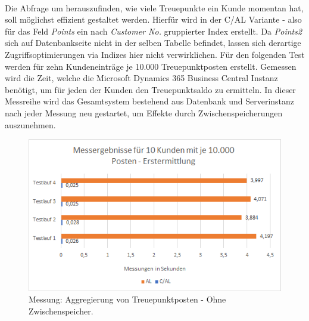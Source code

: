 \paragraph{}
Die Abfrage um herauszufinden, wie viele Treuepunkte ein Kunde momentan hat, soll möglichst effizient gestaltet werden. Hierfür wird in der C/AL Variante - also für das Feld \textit{Points} ein nach \textit{Customer No.} gruppierter Index erstellt. Da \textit{Points2} sich auf Datenbankseite nicht in der selben Tabelle befindet, lassen sich derartige Zugriffsoptimierungen via Indizes hier nicht verwirklichen. Für den folgenden Test werden für zehn Kundeneinträge je 10.000 Treuepunktposten erstellt. Gemessen wird die Zeit, welche die Microsoft Dynamics 365 Business Central Instanz benötigt, um für jeden der Kunden den Treuepunktsaldo zu ermitteln. In dieser Messreihe wird das Gesamtsystem bestehend aus Datenbank und  Serverinstanz nach jeder Messung neu gestartet, um Effekte durch Zwischenspeicherungen auszunehmen.

\begin{figure}[H]
	\centering
	\includegraphics[width=140mm]{images/Test2NoCache}
	\caption{Messung: Aggregierung von Treuepunktposten - Ohne Zwischenspeicher.}
	\label{fig:Test2Schema}
\end{figure}

